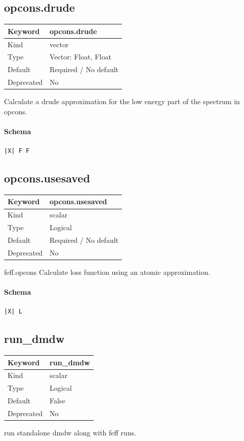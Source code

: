 \documentclass[11pt]{article}
\begin{document}
{{{{{\subsection{opcons.drude}
\label{kw:opcons-drude}
\begin{longtable}{|p{1.5in}|p{4.5in}|}
\hline
Keyword & opcons.drude \\
\hline
Kind & vector \\
\hline
Type & Vector: Float, Float \\
\hline
Default & Required / No default \\
\hline
Deprecated & No \\
\hline
\end{longtable}
 Calculate a drude approximation for the low energy part of the spectrum in opcons.

\paragraph{Schema}
\begin{Verbatim}
|X| F F
\end{Verbatim}

\subsection{opcons.usesaved}
\label{kw:opcons-usesaved}
\begin{longtable}{|p{1.5in}|p{4.5in}|}
\hline
Keyword & opcons.usesaved \\
\hline
Kind & scalar \\
\hline
Type & Logical \\
\hline
Default & Required / No default \\
\hline
Deprecated & No \\
\hline
\end{longtable}
 feff.opcons{ }
 Calculate loss function using an atomic approximation.

\paragraph{Schema}
\begin{Verbatim}
|X| L
\end{Verbatim}

\subsection{run\_dmdw}
\label{kw:run-dmdw}
\begin{longtable}{|p{1.5in}|p{4.5in}|}
\hline
Keyword & run\_dmdw \\
\hline
Kind & scalar \\
\hline
Type & Logical \\
\hline
Default & False \\
\hline
Deprecated & No \\
\hline
\end{longtable}
 run standalone dmdw along with feff runs.

}}}}}
\end{document}
